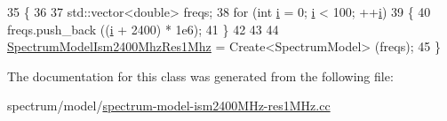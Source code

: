 \begin{DoxyCode}
35   \{
36 
37     std::vector<double> freqs;
38     \textcolor{keywordflow}{for} (\textcolor{keywordtype}{int} \hyperlink{bernuolliDistribution_8m_a6f6ccfcf58b31cb6412107d9d5281426}{i} = 0; \hyperlink{bernuolliDistribution_8m_a6f6ccfcf58b31cb6412107d9d5281426}{i} < 100; ++\hyperlink{bernuolliDistribution_8m_a6f6ccfcf58b31cb6412107d9d5281426}{i})
39       \{
40         freqs.push\_back ((\hyperlink{bernuolliDistribution_8m_a6f6ccfcf58b31cb6412107d9d5281426}{i} + 2400) * 1e6);
41       \}
42 
43 
44     \hyperlink{namespacens3_abc4832a3e0215c64830c831ea89da6c4}{SpectrumModelIsm2400MhzRes1Mhz} = Create<SpectrumModel> (freqs);
45   \}
\end{DoxyCode}


The documentation for this class was generated from the following file\+:\begin{DoxyCompactItemize}
\item 
spectrum/model/\hyperlink{spectrum-model-ism2400MHz-res1MHz_8cc}{spectrum-\/model-\/ism2400\+M\+Hz-\/res1\+M\+Hz.\+cc}\end{DoxyCompactItemize}
